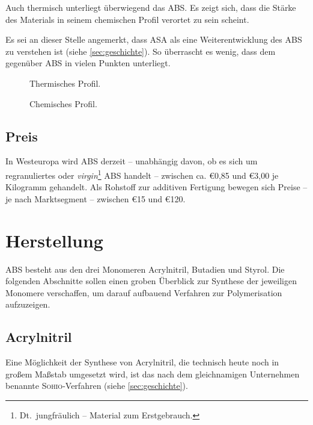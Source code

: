             Auch thermisch unterliegt überwiegend das ABS\@. Es zeigt sich, dass die Stärke des Materials in seinem chemischen
            Profil verortet zu sein scheint.

            Es sei an dieser Stelle angemerkt, dass ASA als eine Weiterentwicklung des ABS zu verstehen ist (siehe \cref{sec:geschichte}).
            So überrascht es wenig, dass dem gegenüber ABS in vielen Punkten unterliegt.
            \begin{figure}[H]
                \centering
                
                \caption{Thermisches Profil.}%
                \label{fig:pc thermal profile}
            \end{figure}
            \begin{figure}[H]
                \centering
                
                \caption{Chemisches Profil.}%
                \label{fig:pc chemical profile}
            \end{figure}
            \newpage
            \nocite{datenblattsammlung.KERN.20210201}
        \subsection{Preis}
            In Westeuropa wird ABS derzeit – unabhängig davon, ob es sich um regranuliertes oder \textit{virgin}\footnote{Dt.\ jungfräulich – Material zum Erstgebrauch.}
            ABS handelt – zwischen ca. €0,85 und €3,00 je Kilogramm gehandelt\cite{rohstoffboerse.kunststoffweb.de.20210206}.
            Als Rohstoff zur additiven Fertigung bewegen sich Preise – je nach Marktsegment – zwischen €15 und €120.

    \section{Herstellung}
        ABS besteht aus den drei Monomeren Acrylnitril, Butadien und Styrol. Die folgenden Abschnitte sollen einen groben
        Überblick zur Synthese der jeweiligen Monomere verschaffen, um darauf aufbauend Verfahren zur Polymerisation aufzuzeigen.
        
        \subsection*{Acrylnitril}
            Eine Möglichkeit der Synthese von Acrylnitril, die technisch heute noch in großem Maßstab umgesetzt wird, ist das nach dem gleichnamigen
            Unternehmen benannte \textsc{Sohio}-Verfahren (siehe \cref{sec:geschichte}).

